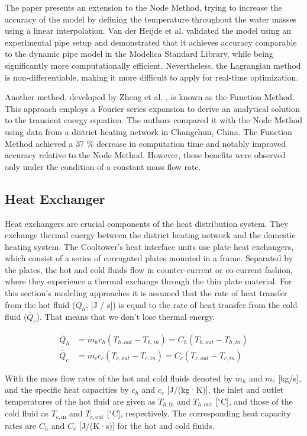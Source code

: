 The paper \cite{OPPELT2016336} presents an extension to the Node Method, trying to increase the accuracy of the model by defining the temperature throughout the water masses using a linear interpolation. Van der Heijde et al. \cite{VANDERHEIJDE2017158} validated the model using an experimental pipe setup and demonstrated that it achieves accuracy comparable to the dynamic pipe model in the Modelica Standard Library, while being significantly more computationally efficient. Nevertheless, the Lagrangian method is non-differentiable, making it more difficult to apply for real-time optimization. 

Another method, developed by Zheng et al. \cite{ZHENG2017682}, is known as the Function Method. This approach employs a Fourier series expansion to derive an analytical solution to the transient energy equation. The authors compared it with the Node Method using data from a district heating network in Changchun, China. The Function Method achieved a 37 \% decrease in computation time and notably improved accuracy relative to the Node Method. However, these benefits were observed only under the condition of a constant mass flow rate. 

\subsection{Heat Exchanger}
Heat exchangers are crucial components of the heat distribution system. They exchange thermal energy between the district heating network and the domestic heating system. The Cooltower's heat interface units use plate heat exchangers, which consist of a series of corrugated plates mounted in a frame. Separated by the plates, the hot and cold fluids flow in counter-current or co-current fashion, where they experience a thermal exchange through the thin plate material. 
For this section's modeling approaches it is assumed that the rate of heat transfer from the hot fluid ($\dot{Q_{h}}$, [J / s]) is equal to the rate of heat transfer from the cold fluid ($\dot{Q_{c}}$). That means that we don't lose thermal energy. 

\begin{align}
    \dot{Q_h} &= \dot{m}_hc_h(T_{h,out} - T_{h,in}) = C_h (T_{h,out} - T_{h,in}) \\  
    \dot{Q_c} &= \dot{m}_cc_c(T_{c,out} - T_{c,in}) = C_c (T_{c,out} - T_{c,in})
\end{align}

With the mass flow rates of the hot and cold fluids denoted by \( \dot{m}_h \) and \( \dot{m}_c \) [kg/s], and the specific heat capacities by \( c_h \) and \( c_c \) [J/(kg·K)], the inlet and outlet temperatures of the hot fluid are given as \( T_{h,\text{in}} \) and \( T_{h,\text{out}} \) [\( ^\circ \)C], and those of the cold fluid as \( T_{c,\text{in}} \) and \( T_{c,\text{out}} \) [\( ^\circ \)C], respectively. The corresponding heat capacity rates are \( C_h \) and \( C_c \) [J/(K·s)] for the hot and cold fluids.

